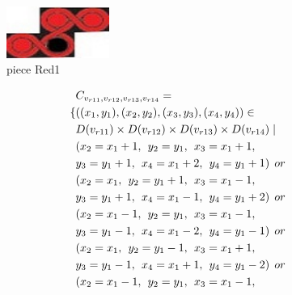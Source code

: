 \begin{appendices}
\begin{itemize}
\begin{figure}[H]
    \centering
    \includegraphics[width=0.3\textwidth]{figs/red1.jpg}
    \caption{piece Red1}
\end{figure}
\begin{align*}
&\Const{r11}{r12}{r13}{r14}=\\
\{&((x_{1},y_{1}),(x_{2},y_{2}),(x_{3},y_{3}),(x_{4},y_{4}))\in 
\\&\Domain{r11}\times \Domain{r12}\times\Domain{r13}\times\Domain{r14}\mid\\
&(x_{2} = x_{1} + 1,\hspace{1ex}y_{2} = y_{1},\hspace{1ex}x_{3} = x_{1} + 1, 
\\&y_{3} = y_{1}+1,\hspace{1ex}x_{4} = x_{1}+2,\hspace{1ex}y_{4} = y_{1}+1)\hspace{1ex} or\\
&(x_{2} = x_{1},\hspace{1ex}y_{2} = y_{1}+1,\hspace{1ex}x_{3} = x_{1}-1, 
\\&y_{3} = y_{1}+1,\hspace{1ex}x_{4} = x_{1}-1,\hspace{1ex}y_{4} = y_{1}+2)\hspace{1ex} or\\
&(x_{2} = x_{1}-1,\hspace{1ex}y_{2} = y_{1},\hspace{1ex}x_{3} = x_{1}-1,
\\&y_{3} = y_{1}-1,\hspace{1ex}x_{4} = x_{1}-2,\hspace{1ex}y_{4} = y_{1}-1)\hspace{1ex} or\\
&(x_{2} = x_{1},\hspace{1ex}y_{2} = y_{1}-1,\hspace{1ex}x_{3} = x_{1}+1, 
\\&y_{3} = y_{1}-1,\hspace{1ex}x_{4} = x_{1}+1,\hspace{1ex}y_{4} = y_{1}-2)\hspace{1ex} or\\
&(x_{2} = x_{1}-1,\hspace{1ex}y_{2} = y_{1},\hspace{1ex}x_{3} = x_{1}-1, 

\end{align*}
\end{itemize}
\end{appendices}
